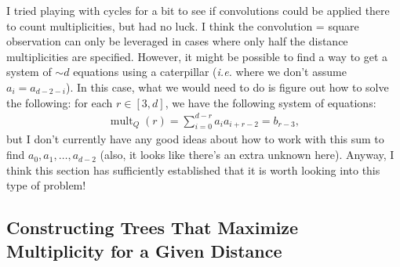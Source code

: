 \documentclass[12]{article}
\DeclarePairedDelimiter\ceil{\lceil}{\rceil}
\DeclareMathOperator{\mult}{mult}
\theoremstyle{definition}
\begin{document}
	I tried playing with cycles for a bit to see if convolutions could be applied there to count multiplicities, but had no luck.  I think the convolution = square observation can only be leveraged in cases where only half the distance multiplicities are specified.  However, it might be possible to find a way to get a system of $\sim d$ equations using a caterpillar (\textit{i.e.} where we don't assume $a_i = a_{d-2-i}$).  In this case, what we would need to do is figure out how to solve the following: for each $r \in [3,d]$, we have the following system of equations:
	\begin{align}
		\mult_Q(r) = \sum_{i=0}^{d-r}a_ia_{i+r-2} = b_{r-3},
	\end{align}
	but I don't currently have any good ideas about how to work with this sum to find $a_0, a_1, \ldots, a_{d-2}$ (also, it looks like there's an extra unknown here).  Anyway, I think this section has sufficiently established that it is worth looking into this type of problem!

	\subsection{Constructing Trees That Maximize Multiplicity for a Given Distance}
	
	
	
	
	
	
\end{document}
